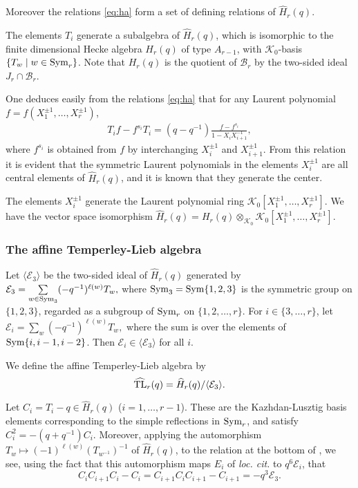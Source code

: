 \documentclass[12pt]{amsart}
\theoremstyle{definition}
\theoremstyle{remark}
\numberwithin{equation}{section}
\newcommand{\CB}{{\mathcal B}}
\newcommand{\CE}{{\mathcal E}}
\newcommand{\CK}{{\mathcal K}}
\newcommand{\be}{\begin{equation}}
\newcommand{\ee}{\end{equation}}
\newcommand{\inv}{^{-1}}
\newcommand{\Sym}{{\rm{Sym}}}
\newcommand{\HH}{\widehat{H}}
\newcommand{\HTL}{\widehat{\rm TL}}
\begin{document}
Moreover the relations \eqref{eq:ha} form a set of defining relations of $\HH_r(q)$.

The elements $T_i$ generate a subalgebra of $\HH_r(q)$, which is isomorphic to the finite dimensional Hecke algebra $H_r(q)$
 of type  $A_{r-1}$, with $ \CK_0$-basis $\{T_w\mid w\in\Sym_r\}$. Note that  
$H_r(q)$ is the quotient of $\CB_r$ by the two-sided ideal  $J_r\cap\CB_r$. 


One deduces easily from the relations \eqref{eq:ha} that for any Laurent polynomial $f=f(X^{\pm 1}_1, \dots, X^{\pm 1}_r)$,
\begin{eqnarray}\label{eq:Bernstein-relation}
T_i f - f^{s_i} T_i = (q-q^{-1}) \frac{f - f^{s_i}}{1-X_i X_{i+1}^{-1}},
\end{eqnarray}
where  $f^{s_i}$ is obtained from $f$ by interchanging $X^{\pm 1}_i$ and $X^{\pm 1}_{i+1}$.  
From this relation it is evident that the symmetric Laurent polynomials in the elements $X_i^{\pm 1}$ are all 
central elements of $\HH_r(q)$, and it is known \cite{L} that they generate the center. 


The elements $X_i^{\pm 1}$ generate the Laurent polynomial ring $\CK_0[X^{\pm 1}_1, \dots, X^{\pm 1}_r]$.  We have the vector space isomorphism
$
\HH_r(q)=H_r(q)\otimes_{\CK_0}\CK_0[X^{\pm 1}_1, \dots, X^{\pm 1}_r].
$

%
%
\subsubsection{The affine Temperley-Lieb algebra}\label{ss:atl}
%
%
Let $\langle \CE_3\rangle$ be the two-sided ideal of $\HH_r(q)$ generated by 
$
\CE_3=\sum\limits_{w\in\Sym_3}(-q^{-1})^{\ell(w)} T_w, 
$
where $\Sym_3=\Sym\{1, 2,3\}$ is the symmetric group on $\{1, 2,3\}$, 
regarded as a subgroup of $\Sym_r$ on $\{1, 2, \dots, r\}$.  For $i\in\{ 3, \dots,  r\}$, let 
$
\CE_i=\sum\limits_{w}(-q^{-1})^{\ell(w)} T_w, 
$
where the sum is over the elements of $\Sym\{i, i-1, i-2\}$.  Then $\CE_i\in\langle \CE_3\rangle$ for all $i$.  





We define the affine Temperley-Lieb algebra \cite{GL03} by
\be\label{eq:defhtl}
\HTL_r(q) = \HH_r(q)/ \langle \CE_3\rangle. 
\ee



Let $C_i=T_i-q\in\HH_r(q)$ ($i=1,\dots, r-1$). These are the Kazhdan-Lusztig basis elements corresponding
to the simple reflections in $\Sym_r$, and satisfy $C_i^2=-(q+q\inv)C_i$. 
Moreover, applying  the automorphism $T_w\mapsto(-1)^{\ell(w)}(T_{w\inv})\inv$ of $\HH_r(q)$, 
to the relation at the bottom of
\cite[p. 487]{GL03}, we see, using the fact that this automorphism maps $E_i$ of {\it loc. cit.} to $q^6\CE_{i}$, that
\be\label{eq:tlc}
C_iC_{i+1}C_i-C_i=C_{i+1}C_iC_{i+1}-C_{i+1}=-q^3\CE_3.
\ee
\end{document}
